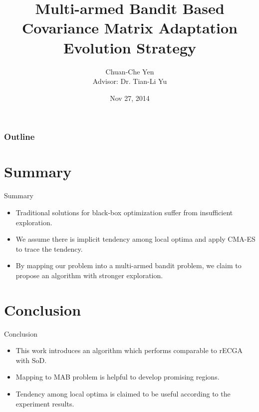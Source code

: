\documentclass{beamer}
\title[MAB-based CMA-ES]{Multi-armed Bandit Based Covariance Matrix Adaptation
Evolution Strategy}
\author[Chuan-Che Yen]{Chuan-Che Yen \\Advisor: Dr. Tian-Li Yu}
\institute{TEILab}
\date{Nov 27, 2014}
\begin{document}
\begin{frame}
  \titlepage
\end{frame}
\begin{frame}
  \frametitle{Outline}
  \tableofcontents[
    currentsubsection,
    sectionstyle=show/show,
    subsectionstyle=show/hide,
  ]
\end{frame}




%
%
%

\section{Summary}
\begin{frame}{Summary}

  \begin{itemize}
    \item Traditional solutions for black-box optimization suffer from
      insufficient exploration.
    \item We assume there is implicit tendency among local optima and
      apply CMA-ES to trace the tendency.
    \item By mapping our problem into a multi-armed bandit problem, we
      claim to propose an algorithm with stronger exploration.
  \end{itemize}
\end{frame}

\section{Conclusion}
\begin{frame}{Conclusion}
  \begin{itemize}
    \item This work introduces an algorithm which performs comparable to
      rECGA with SoD.
    \item Mapping to MAB problem is helpful to develop promising
      regions. 
    \item Tendency among local optima is claimed to be useful according to
      the experiment results.
  \end{itemize}
\end{frame}
\end{document}
